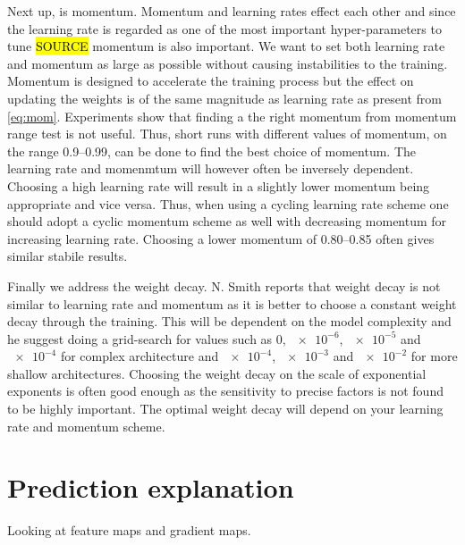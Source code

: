Next up, is momentum. Momentum and learning rates effect each other and since
the learning rate is regarded as one of the most important hyper-parameters to
tune \hl{SOURCE} momentum is also important. We want to set both learning rate
and momentum as large as possible without causing instabilities to the training.
Momentum is designed to accelerate the training process but the effect on
updating the weights is of the same magnitude as learning rate as present from
\cref{eq:mom}. Experiments show that finding a the right momentum from momentum
range test is not useful. Thus, short runs with different values of momentum, on
the range 0.9--0.99, can be done to find the best choice of momentum. The
learning rate and momenmtum will however often be inversely dependent. Choosing
a high learning rate will result in a slightly lower momentum being appropriate
and vice versa. Thus, when using a cycling learning rate scheme one should adopt
a cyclic momentum scheme as well with decreasing momentum for increasing
learning rate. Choosing a lower momentum of 0.80--0.85 often gives similar stabile results.

Finally we address the weight decay. N. Smith reports that weight decay is not similar to learning rate and momentum as it is better to choose a constant weight decay through the training. This will be dependent on the model complexity and he suggest doing a grid-search for values such as 0, $\num{e-6}$, $\num{e-5}$ and $\num{e-4}$ for complex architecture and $\num{e-4}$, $\num{e-3}$ and $\num{e-2}$ for more shallow architectures. Choosing the weight decay on the scale of exponential exponents is often good enough as the sensitivity to precise factors is not found to be highly important. The optimal weight decay will depend on your learning rate and momentum scheme.













\section{Prediction explanation}
Looking at feature maps and gradient maps.


